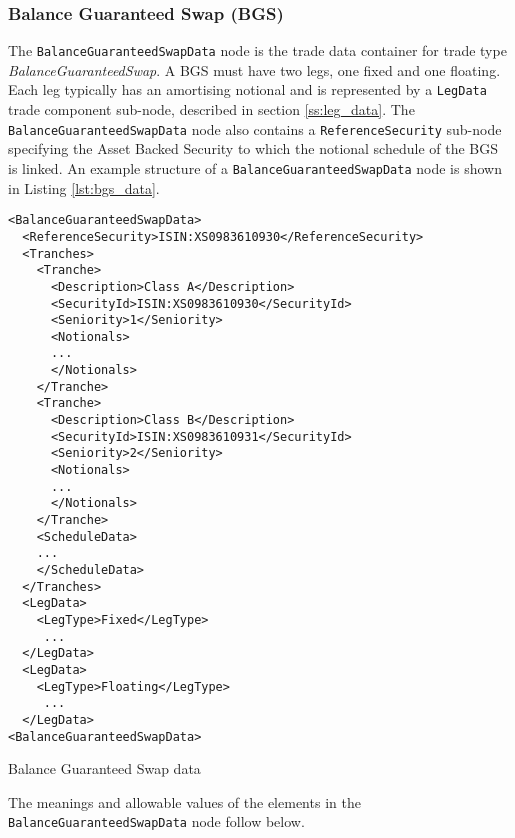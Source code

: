 \subsubsection{Balance Guaranteed Swap (BGS)}

The \lstinline!BalanceGuaranteedSwapData! node is the trade data container for trade type \emph{BalanceGuaranteedSwap}.  A BGS must have two legs, one fixed and one floating. Each leg typically has an amortising notional and is represented by a \lstinline!LegData! trade component sub-node, described in section \ref{ss:leg_data}.
The \lstinline!BalanceGuaranteedSwapData! node also contains a \lstinline!ReferenceSecurity! sub-node specifying the Asset Backed Security to which the notional schedule of the BGS is linked. 
An example structure of a  \lstinline!BalanceGuaranteedSwapData! node is shown in Listing \ref{lst:bgs_data}.
\begin{listing}[H]
\begin{verbatim}
<BalanceGuaranteedSwapData>
  <ReferenceSecurity>ISIN:XS0983610930</ReferenceSecurity>
  <Tranches>
    <Tranche>
      <Description>Class A</Description>
      <SecurityId>ISIN:XS0983610930</SecurityId>
      <Seniority>1</Seniority>
      <Notionals>
      ...
      </Notionals>
    </Tranche>
    <Tranche>
      <Description>Class B</Description>
      <SecurityId>ISIN:XS0983610931</SecurityId>
      <Seniority>2</Seniority>
      <Notionals>
      ...
      </Notionals>
    </Tranche>
    <ScheduleData>
    ...
    </ScheduleData>
  </Tranches>
  <LegData>
	<LegType>Fixed</LegType>
	 ...
  </LegData>
  <LegData>
	<LegType>Floating</LegType>
	 ...
  </LegData>
<BalanceGuaranteedSwapData>
\end{verbatim}
\caption{Balance Guaranteed Swap data}
\label{lst:bgs_data}
\end{listing}

The meanings and allowable values of the elements in the \lstinline!BalanceGuaranteedSwapData!  node follow below.

